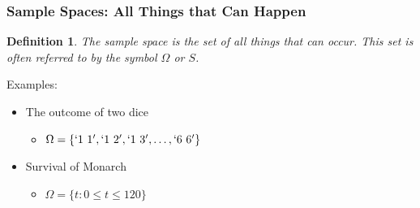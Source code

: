 \documentclass{beamer}
\newtheorem{defn}{Definition}
\numberwithin{equation}{section}
\begin{document}
\begin{frame}
\frametitle{Sample Spaces: All Things that Can Happen}

\begin{defn}
The \alert{sample space} is the set of all things that can occur.  This set is often referred to by the symbol $\Omega$ or $S$.
\end{defn}
\pause 
{Examples: } \pause 
\begin{itemize}
\item[1)] The outcome of two dice  \pause
\begin{itemize}
\item[-] $\Omega = \{`1\ 1', `1\ 2' , `1\ 3', \hdots, `6\ 6'\}$ \pause
\end{itemize}
\item[2)] Survival of Monarch \pause
\begin{itemize}
\item[-] $\Omega = \{t: 0\leq t \leq 120\}$ 
\end{itemize}

\end{itemize}
\end{frame}
\end{document}
